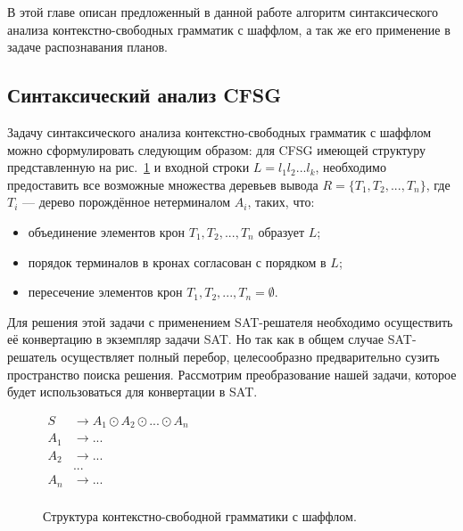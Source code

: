 \documentclass[14pt]{matmex-diploma-custom}
\begin{document}
    В этой главе описан предложенный в данной работе алгоритм синтаксического анализа контекстно-свободных грамматик с шаффлом,
    а так же его применение в задаче распознавания планов.
    
    \subsection{Синтаксический анализ CFSG}
    
    Задачу синтаксического анализа контекстно-свободных грамматик с шаффлом можно сформулировать следующим 
    образом: для CFSG имеющей структуру представленную на рис.~\ref{grammar_G2}
    и входной строки $L = l_1l_2...l_k$, необходимо предоставить все возможные множества деревьев вывода $R = \{T_1, T_2, ..., T_n\}$,
    где $T_i$ --- дерево порождённое нетерминалом $A_i$, таких, что:
    \begin{itemize}
    	\item объединение элементов крон $T_1, T_2, ..., T_n$ образует $L$;
    	\item порядок терминалов в кронах согласован с порядком в $L$;
    	\item пересечение элементов крон $T_1, T_2, ..., T_n = \emptyset$.
    \end{itemize}
    
    
    
    Для решения этой задачи с применением SAT-решателя необходимо осуществить её конвертацию в экземпляр задачи SAT.
    Но так как в общем случае SAT-решатель осуществляет полный перебор, 
    целесообразно предварительно сузить пространство поиска решения. Рассмотрим преобразование нашей задачи,
    которое будет использоваться для конвертации в SAT.
    
    \begin{figure}[H]
    	\centering
    	{$\begin{aligned}
    		S &\rightarrow A_1 \odot A_2 \odot ... \odot A_n \\
    		A_1 &\rightarrow ... \\
    		A_2 &\rightarrow ... \\ 
    		&... \\
    		A_n & \rightarrow ... \\
    		\end{aligned}$}
    	\caption{Структура контекстно-свободной грамматики с шаффлом.}
    	\label{grammar_G2}
    \end{figure}
    
\end{document}
